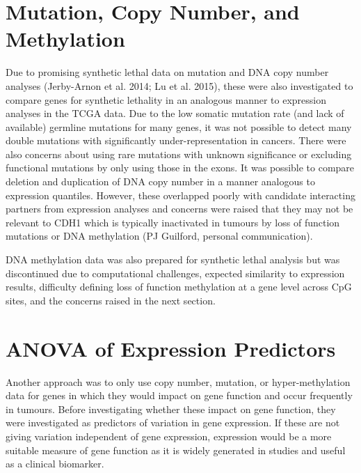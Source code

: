 \section{Mutation, Copy Number, and Methylation}

Due to promising synthetic lethal data on mutation and DNA copy number analyses (Jerby-Arnon et al. 2014; Lu et al. 2015), these were also investigated to compare genes for synthetic lethality in an analogous manner to expression analyses in the TCGA data. Due to the low somatic mutation rate (and lack of available) germline mutations for many genes, it was not possible to detect many double mutations with significantly under-representation in cancers. There were also concerns about using rare mutations with unknown significance or excluding functional mutations by only using those in the exons.
It was possible to compare deletion and duplication of DNA copy number in a manner analogous to expression quantiles. However, these overlapped poorly with candidate interacting partners from expression analyses and concerns were raised that they may not be relevant to CDH1 which is typically inactivated in tumours by loss of function mutations or DNA methylation (PJ Guilford, personal communication).   

DNA methylation data was also prepared for synthetic lethal analysis but was discontinued due to computational challenges, expected similarity to expression results, difficulty defining loss of function methylation at a gene level across CpG sites, and the concerns raised in the next section. 

\section{ANOVA of Expression Predictors}

Another approach was to only use copy number, mutation, or hyper-methylation data for genes in which they would impact on gene function and occur frequently in tumours. Before investigating whether these impact on gene function, they were investigated as predictors of variation in gene expression. If these are not giving variation independent of gene expression, expression would be a more suitable measure of gene function as it is widely generated in studies and useful as a clinical biomarker.

